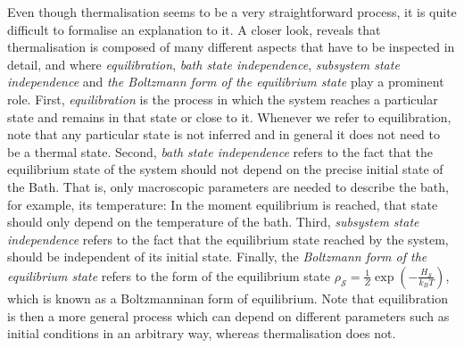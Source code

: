 \indent Even though thermalisation seems to be a very straightforward process, it is quite difficult to formalise an explanation to it. A closer look, reveals that thermalisation is composed of many different aspects that have to be inspected in detail, and where \textit{equilibration}, \textit{bath state independence}, \textit{subsystem state independence} and \textit{the Boltzmann form of the equilibrium state} play a prominent role\cite{linden_quantum_2009}. First, \textit{equilibration} is the process in which the system reaches a particular state and remains in that state or close to it. Whenever we refer to equilibration, note that any particular state is not inferred and in general it does not need to be a thermal state. Second, \textit{bath state independence} refers to the fact that the equilibrium state of the system should not depend on the precise initial state of the Bath. That is, only macroscopic parameters are needed to describe the bath\cite{linden_quantum_2009}, for example, its temperature: In the moment equilibrium is reached, that state should only depend on the temperature of the bath. Third, \textit{subsystem state independence} refers to the fact that the equilibrium state reached by the system, should be independent of its initial state. Finally, the \textit{Boltzmann form of the equilibrium state} refers to the form of the equilibrium state $\rho_{\mathcal{S}}=\frac{1}{Z}\operatorname{exp}(-\frac{H_{\mathcal{S}}}{k_B T})$, which is known as a Boltzmanninan form of equilibrium. Note that equilibration is then a more general process which can depend on different parameters such as initial conditions in an arbitrary way, whereas thermalisation does not.\\
